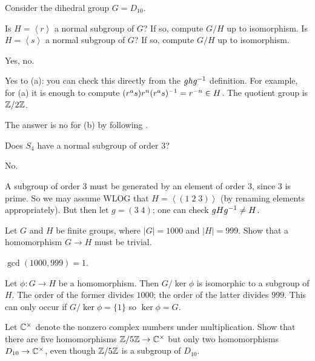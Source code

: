 \begin{problem}
	Consider the dihedral group $G = D_{10}$.
	\begin{enumerate}[(a)]
		\ii Is $H = \left< r \right>$ a normal subgroup of $G$?
		If so, compute $G/H$ up to isomorphism.
		\ii Is $H = \left< s \right>$ a normal subgroup of $G$?
		If so, compute $G/H$ up to isomorphism.
	\end{enumerate}
	\begin{hint}
		Yes, no.
	\end{hint}
	\begin{sol}
		Yes to (a): you can check this directly
		from the $ghg^{-1}$ definition.
		For example, for (a)
		it is enough to compute $(r^a s) r^n (r^a s)^{-1} = r^{-n} \in H$.
		The quotient group is $\mathbb Z/2\mathbb Z$.

		The answer is no for (b) by following
		.
	\end{sol}
\end{problem}

\begin{problem}
	Does $S_4$ have a normal subgroup of order $3$?
	\begin{hint}
		No.
	\end{hint}
	\begin{sol}
		A subgroup of order $3$ must be generated by
		an element of order $3$, since $3$ is prime.
		So we may assume WLOG that $H = \left< (1\; 2 \; 3) \right>$
		(by renaming elements appropriately).
		But then let $g = (3 \; 4)$; one can check $gHg^{-1} \neq H$.
	\end{sol}
\end{problem}

\begin{problem}
	Let $G$ and $H$ be finite groups, where $\left\lvert G \right\rvert = 1000$
	and $\left\lvert H \right\rvert = 999$.
	Show that a homomorphism $G \to H$ must be trivial.
	\begin{hint}
		$\gcd(1000,999)=1$.
	\end{hint}
	\begin{sol}
		Let $\phi \colon G \to H$ be a homomorphism.
		Then $G / \ker\phi$ is isomorphic to a subgroup of $H$.
		The order of the former divides $1000$;
		the order of the latter divides $999$.
		This can only occur if $G / \ker\phi = \{1\}$
		so $\ker\phi = G$.
	\end{sol}
\end{problem}

\begin{problem}
	Let $\mathbb C^\times$ denote the nonzero complex numbers under multiplication.
	Show that there are five homomorphisms $\mathbb Z/5\mathbb Z \to \mathbb C^\times$
	but only two homomorphisms $D_{10} \to \mathbb C^\times$,
	even though $\mathbb Z/5\mathbb Z$ is a subgroup of $D_{10}$.
\end{problem}

